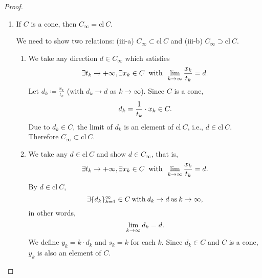 \documentclass[a4paper,11pt, oneside]{book}
\theoremstyle{definition}
\begin{document}
\begin{proof}
\begin{enumerate}[label=\roman*,align=CenterWithParen]
    We need to show two relations: (ii-a) $(\text{cl}\:C)_{\infty} \supset C_{\infty}$ (ii-b) $(\text{cl}\:C)_{\infty} \subset C_{\infty}$.

      \begin{enumerate}[label=ii-\alph*,align=CenterWithParen2]
        \item We show that $C_{\infty}$ is included in $(\text{cl}\:C)_{\infty}$. However it is clear from the definition of asymptotic cones.

        \item We show that $(\text{cl}\:C)_{\infty} \subset C_{\infty}$. Like (i-b), we will show that.

      \end{enumerate}
      Then the proof of (ii) is also completed.
    \item If $C$ is a cone, then $C_{\infty} = \text{cl}\:C$.

    We need to show two relations: (iii-a) $C_{\infty} \subset \text{cl}\:C$ and (iii-b) $C_{\infty} \supset  \text{cl}\:C$.

    \begin{enumerate}[label=iii-\alph*,align=CenterWithParen2]
      \item We take any direction $d \in C_{\infty}$ which satisfies
      \begin{equation}
        \exists t_k \rightarrow + \infty , \exists x_k \in C \:\text{ with }\: \lim_{k \to \infty} \frac{x_k}{t_k} = d. \notag
      \end{equation}
      Let $d_k \coloneqq \frac{x_k}{t_k}$ (with $d_k \rightarrow d$ as $k \rightarrow \infty$). Since $C$ is a cone,
      \begin{equation}
        d_k = \frac{1}{t_k} \cdot x_k \in C. \notag
      \end{equation}
      Due to $d_k \in C$, the limit of $d_k$ is an element of $\text{cl}\:C$, i.e., $d \in \text{cl}\:C$.
      Therefore $C_{\infty} \subset \text{cl}\:C$.

      \item We take any $d \in \text{cl}\:C$ and show $d \in C_{\infty}$, that is,
      \begin{equation}
        \exists t_k \rightarrow + \infty , \exists x_k \in C \:\text{ with }\: \lim_{k \to \infty} \frac{x_k}{t_k} = d. \notag
      \end{equation}
      By $d \in \text{cl}\:C$,
      \begin{equation}
        \exists \{d_k\}_{k=1}^{\infty} \in C \:\text{with}\: d_k \rightarrow d \:\text{as}\: k \rightarrow \infty, \notag
      \end{equation}
      in other words,
      \begin{equation}
        \lim_{k \to \infty} d_k = d. \notag
      \end{equation}
      We define $y_k = k \cdot d_k$ and $s_k = k$ for each $k$. Since $d_k \in C$ and $C$ is a cone, $y_k$ is also an element of $C$.


\end{enumerate}
\end{enumerate}
\end{proof}
\end{document}
